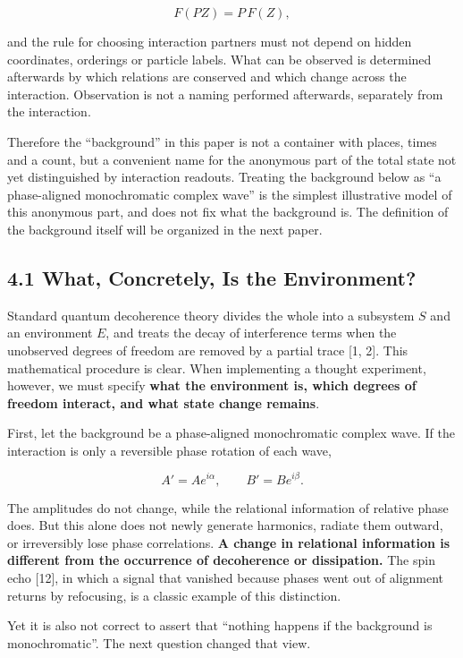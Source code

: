 \documentclass[
  a4paper,
]{article}
\begin{document}
\[
F(PZ)=P\,F(Z),
\]

and the rule for choosing interaction partners must not depend on hidden
coordinates, orderings or particle labels. What can be observed is
determined afterwards by which relations are conserved and which change
across the interaction. Observation is not a naming performed
afterwards, separately from the interaction.

Therefore the ``background'' in this paper is not a container with
places, times and a count, but a convenient name for the anonymous part
of the total state not yet distinguished by interaction readouts.
Treating the background below as ``a phase-aligned monochromatic complex
wave'' is the simplest illustrative model of this anonymous part, and
does not fix what the background is. The definition of the background
itself will be organized in the next paper.

\subsection{4.1 What, Concretely, Is the
Environment?}\label{what-concretely-is-the-environment}

Standard quantum decoherence theory divides the whole into a subsystem
\(S\) and an environment \(E\), and treats the decay of interference
terms when the unobserved degrees of freedom are removed by a partial
trace {[}1, 2{]}. This mathematical procedure is clear. When
implementing a thought experiment, however, we must specify \textbf{what
the environment is, which degrees of freedom interact, and what state
change remains}.

First, let the background be a phase-aligned monochromatic complex wave.
If the interaction is only a reversible phase rotation of each wave,

\[
A'=Ae^{i\alpha},\qquad B'=Be^{i\beta}.
\]

The amplitudes do not change, while the relational information of
relative phase does. But this alone does not newly generate harmonics,
radiate them outward, or irreversibly lose phase correlations. \textbf{A
change in relational information is different from the occurrence of
decoherence or dissipation.} The spin echo {[}12{]}, in which a signal
that vanished because phases went out of alignment returns by
refocusing, is a classic example of this distinction.

Yet it is also not correct to assert that ``nothing happens if the
background is monochromatic''. The next question changed that view.
\end{document}
